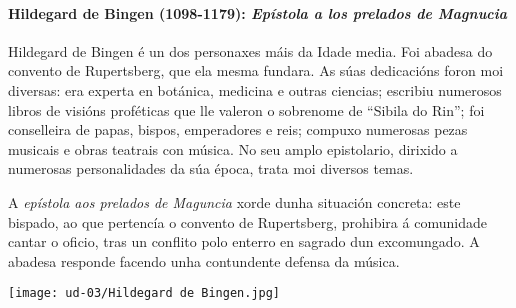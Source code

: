 %
%
\begin{multicols}{2}
%
%
  \paragraph{Hildegard de Bingen (1098-1179): \emph{Epístola a los prelados de Magnucia}}\label{Hildegard de Bingen}
%
  Hildegard de Bingen é un dos personaxes máis da Idade media. Foi abadesa do convento de Rupertsberg, que ela mesma fundara. As súas dedicacións foron moi diversas: era experta en botánica, medicina e outras ciencias; escribiu numerosos libros de visións proféticas que lle valeron o sobrenome de ``Sibila do Rin''; foi conselleira de papas, bispos, emperadores e reis; compuxo numerosas pezas musicais e obras teatrais con música. No seu amplo epistolario, dirixido a numerosas personalidades da súa época, trata moi diversos temas.

  A \emph{epístola aos prelados de Maguncia} xorde dunha situación concreta: este bispado, ao que pertencía o convento de Rupertsberg, prohibira á comunidade cantar o oficio, tras un conflito polo enterro en sagrado dun excomungado. A abadesa responde facendo unha contundente defensa da música.

\begin{Figura}
  \centering
  \texttt{[image: ud-03/Hildegard de Bingen.jpg]}
  \label{fig:Hildegard-Bingen}
\end{Figura}
%
\end{multicols}
%
\vspace*{0.05cm}
